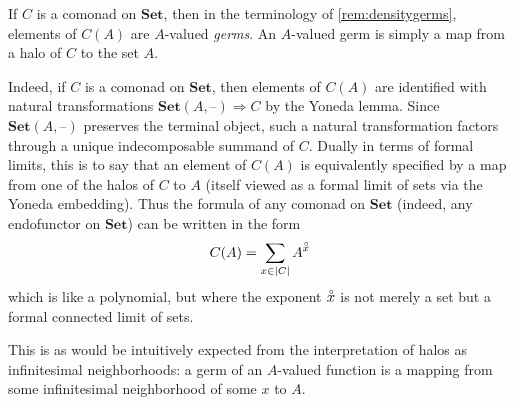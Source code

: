 \documentclass[11pt, oneside, article]{memoir}
\theoremstyle{plain}
\theoremstyle{definition}
\theoremstyle{remark}
\newenvironment{remark}
{\renewcommand\qedsymbol{$\lrcorner$}%
  \pushQED{\qed}\myremark}
{\popQED\endmyremark}
\DeclarePairedDelimiter{\abs}{\lvert}{\rvert}
\newcommand{\dash}{{\mathord{\text{--}}}}
\newcommand{\namedcat}[1]{\mathbf{#1}}
\newcommand{\Set}{\namedcat{Set}}
\newcommand{\pts}[1]{{\abs{#1}}}
\newcommand{\halo}[1]{\accentset{\circ}{#1}}
\newcommand{\cmnd}[1]{{#1}}
\newcommand{\xA}{A}
\newcommand{\cC}{\cmnd{C}}
\begin{document}
\begin{remark}[Germs]\label{rem:halogerm}
  If $\cC$ is a comonad on $\Set$, then in the terminology of
  \cref{rem:densitygerms}, elements of $\cC(\xA)$ are $\xA$-valued
  \emph{germs}. An $\xA$-valued germ is simply a map from a halo of
  $\cC$ to the set $\xA$.
  
  Indeed, if $\cC$ is a comonad on $\Set$, then elements of $\cC(\xA)$
  are identified with natural transformations
  $\Set(\xA, \dash) \Rightarrow \cC$ by the Yoneda lemma. Since
  $\Set(\xA, \dash)$ preserves the terminal object, such a natural
  transformation factors through a unique indecomposable summand of
  $\cC$. Dually in terms of formal limits, this is to say that an
  element of $\cC(\xA)$ is equivalently specified by a map from one of
  the halos of $\cC$ to $\xA$ (itself viewed as a formal limit of sets
  via the Yoneda embedding). Thus the formula of any comonad on $\Set$
  (indeed, any endofunctor on $\Set$) can be written in the form
  \[
    \cC(\xA) = \sum_{x \in \pts{\cC}} \xA^{\halo{x}}
  \]
  which is like a polynomial, but where the exponent $\halo{x}$ is not
  merely a set but a formal connected limit of sets.

  This is as would be intuitively expected from the interpretation of
  halos as infinitesimal neighborhoods: a germ of an $\xA$-valued
  function is a mapping from some infinitesimal neighborhood of some
  $x$ to $\xA$.
\end{remark}
\end{document}
